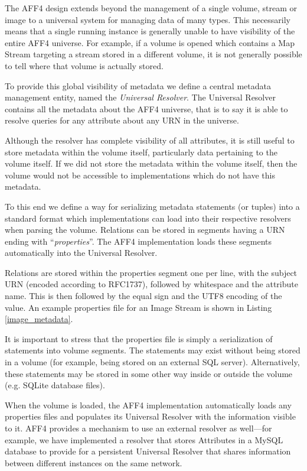 \documentclass[10pt, conference]{IEEEtran}
\begin{document}
The AFF4 design extends beyond the management of a single volume,
stream or image to a universal system for managing data of many
types. This necessarily means that a single running instance is
generally unable to have visibility of the entire AFF4 universe. For
example, if a volume is opened which contains a Map Stream targeting a
stream stored in a different volume, it is not generally possible to
tell where that volume is actually stored.

To provide this global visibility of metadata we define a central
metadata management entity, named the {\em Universal Resolver}. The
Universal Resolver contains all the metadata about the AFF4 universe,
that is to say it is able to resolve queries for any attribute about
any URN in the universe.

Although the resolver has complete visibility of all attributes, it is
still useful to store metadata within the volume itself, particularly
data pertaining to the volume itself. If we did not store the metadata
within the volume itself, then the volume would not be accessible to
implementations which do not have this metadata.

To this end we define a way for serializing metadata statements (or
tuples) into a standard format which implementations can load into
their respective resolvers when parsing the volume. Relations can be
stored in segments having a URN ending with ``{\em properties}''. The
AFF4 implementation loads these segments automatically into the
Universal Resolver.

Relations are stored within the properties segment one per line, with
the subject URN (encoded according to RFC1737), followed by whitespace
and the attribute name. This is then followed by the equal sign and
the UTF8 encoding of the value. An example properties file for an
Image Stream is shown in Listing \ref{image_metadata}.

It is important to stress that the properties file is simply a
serialization of statements into volume segments. The statements may
exist without being stored in a volume (for example, being stored on
an external SQL server). Alternatively, these statements may be stored
in some other way inside or outside the volume (e.g. SQLite
database files).

When the volume is loaded, the AFF4 implementation automatically loads
any properties files and populates its Universal Resolver with the
information visible to it. AFF4 provides a mechanism to use an
external resolver as well---for example, we have implemented a
resolver that stores Attributes in a MySQL database to provide for a
persistent Universal Resolver that shares information between
different instances on the same network.
\end{document}
